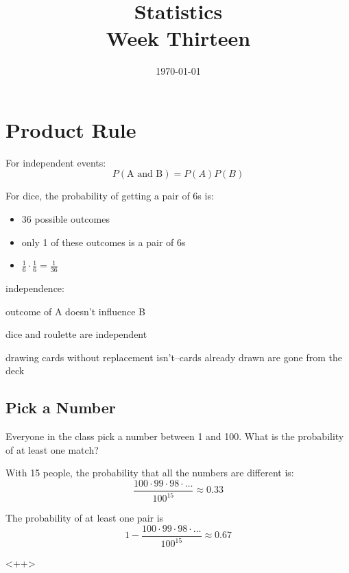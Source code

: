 \documentclass[landscape]{exam}
\title{Statistics \\ Week Thirteen}
\date{\today}
\author{}
\begin{document}
  \maketitle
  \tableofcontents

  \section{Product Rule}

  For independent events:
  \[
    P(\text{A and B}) = P(A) P(B)
  \]

  For dice, the probability of getting a pair of 6s is:
  \begin{itemize}
    \item 36 possible outcomes
    \item only 1 of these outcomes is a pair of 6s
    \item $\frac{1}{6} \cdot \frac{1}{6} = \frac{1}{36}$
  \end{itemize}


  independence:
  \begin{itemize*}
    \item outcome of A doesn't influence B
    \item dice and roulette are independent
    \item drawing cards without replacement isn't--cards already drawn are gone
      from the deck
  \end{itemize*}

  \subsection{Pick a Number}
  Everyone in the class pick a number between 1 and 100. What is the probability
  of at least one match?

  \begin{solution}
    With 15 people, the probability that all the numbers are different is:
    \[
      \frac{100 \cdot 99 \cdot 98 \cdot \ldots}{100^15} \approx 0.33
    \]

    The probability of at least one pair is
    \[
      1 - \frac{100 \cdot 99 \cdot 98 \cdot \ldots}{100^15} \approx \boxed{ 0.67 }
    \]
  \end{solution}<++>
\end{document}
